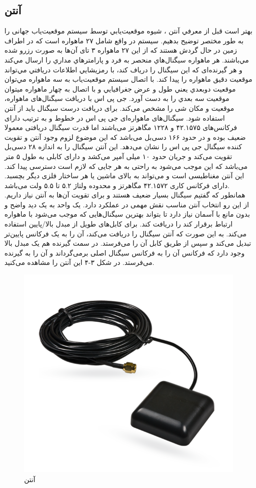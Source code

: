 \subsection{آنتن }
بهتر است قبل از معرفي آنتن ، شيوه موقعيت‌يابي توسط سيستم موقعیت‌یاب جهانی  را به طور مختصر توضيح بدهيم. سيستم  در واقع شامل ۲۷ ماهواره است كه در اطراف زمين در حال گردش هستند كه از اين ۲۷ ماهواره ۳ تای آن‌ها به صورت رزرو شده مي‌باشند. هر ماهواره سيگنال‌هاي منحصر به فرد و پارامترهاي مداري را ارسال مي‌كند و هر گیرنده‌ای كه اين سيگنال را درياف كند، با رمزيشايي اطلاعات دريافتي مي‌تواند موقعيت دقيق ماهواره را پيدا كند. با اتصال سيستم موقعيت‌ياب به سه ماهواره مي‌توان موقعيت دوبعدي يعني طول و عرض جغرافيايي و با اتصال به چهار ماهواره ميتوان موقعيت سه بعدي را به دست آورد.
جی پی اس با دریافت سیگنال‌های ماهواره، موقعیت و مکان شی را مشخص می‌کند. برای دریافت درست سیگنال باید از آنتن استفاده شود. سیگنال‌های ماهواره‌ای جی پی اس در خطوط  و  به ترتیب دارای فرکانس‌های ۴۲.۱۵۷۵ و ۱۲۲۸ مگاهرتز می‌باشند اما قدرت سیگنال دریافتی معمولا ضعیف بوده و در حدود ۱۶۶ دسی‌بل می‌باشد که این موضوع لزوم وجود آنتن و تقویت کننده سیگنال جی پی اس را نشان می‌دهد. این آنتن سیگنال را به اندازه ۲۸ دسی‌بل تقویت می‌کند و جریان حدود ۱۰ میلی آمپر می‌کشد و دارای کابلی به طول ۵ متر می‌باشد که این موجب می‌شود به راحتی به هر جایی که لازم است دسترسی پیدا کند. این آنتن مغناطیسی است و می‌تواند به بالای ماشین یا هر ساختار فلزی دیگر بچسبد. دارای فرکانس کاری ۴۲.۱۵۷۲ مگاهرتز و محدوده ولتاژ ۵.۲ تا ۵.۵ ولت می‌باشد.
\\


همانطور که گفتیم سیگنال  بسیار ضعیف هستند و برای تقویت آن‌ها به آنتن نیاز داریم. از این رو انتخاب آنتن مناسب نقش مهمی در عملکرد  دارد. یک واحد  به یک دید واضح و بدون مانع با آسمان نیاز دارد تا بتواند بهترین سیگنال‌هایی که موجب می‌شود با ماهواره ارتباط برقرار کند را دریافت کند.  برای کابل‌های طویل از مبدل بالا/پایین استفاده می‌کند. به این صورت که آنتن سیگنال  را دریافت می‌کند، آن را به یک فرکانس پایین‌تر تبدیل می‌کند و سپس از طریق کابل  آن را می‌فرستد. در سمت گیرنده  هم یک مبدل بالا وجود دارد که فرکانس آن را به فرکانس سیگنال اصلی برمی‌گرداند و آن را به گیرنده  می‌فرستد.
در شکل ۳-۴ این آنتن را مشاهده می‌کنید.
\begin{figure}[!h]
	\centerline{\includegraphics[width=.5\textwidth]{gps-antanna}}
	\caption{آنتن }
\end{figure}

